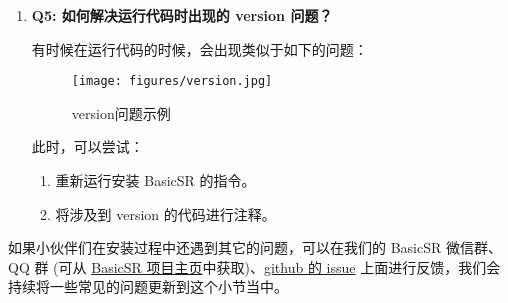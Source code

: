 \documentclass[../main.tex]{subfiles}
\begin{document}
\begin{enumerate}
    \item \textbf{Q5: 如何解决运行代码时出现的 version 问题？}

    有时候在运行代码的时候，会出现类似于如下的问题：
    \begin{figure}[H]
	\begin{center}
		\texttt{[image: figures/version.jpg]}
		\caption{version问题示例}
		\label{fig:version}
	\end{center}
	\vspace{-0.5cm}
    \end{figure}
    此时，可以尝试：
    \begin{enumerate}
        \item 重新运行安装 BasicSR 的指令。
        \item 将涉及到 version 的代码进行注释。
    \end{enumerate}

\end{enumerate}

\begin{hl}
    如果小伙伴们在安装过程中还遇到其它的问题，可以在我们的 BasicSR 微信群、 QQ 群 (可从 \href{https://github.com/XPixelGroup/BasicSR/blob/master/README_CN.md}{BasicSR 项目主页}中获取)、\href{https://github.com/XPixelGroup/BasicSR/issues}{github 的 issue} 上面进行反馈，我们会持续将一些常见的问题更新到这个小节当中。
\end{hl}
\end{document}
